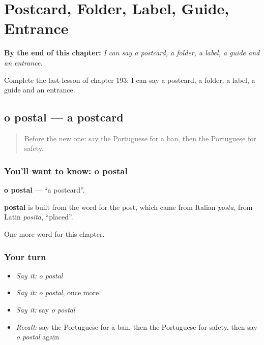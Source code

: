 
\chapter{Postcard, Folder, Label, Guide, Entrance}
\label{ch:pt-postcard-folder-label-guide-entrance}

\begin{chapteropening}
\textbf{By the end of this chapter:} \emph{I can say a postcard, a folder, a label, a guide and an entrance.}

Complete the last lesson of chapter 193: I can say a postcard, a folder, a label, a guide and an entrance.
\end{chapteropening}

\section[o postal]{o postal — a postcard}

\label{lesson:PT-C193-postal}



\begin{quote}
Before the new one: say the Portuguese for a ban, then the Portuguese for safety.
\end{quote}

\subsection*{You'll want to know: o postal}
\textbf{o postal} — \textquotedblleft{}a postcard\textquotedblright{}.

\begin{cousinweb}
\textbf{postal} is built from the word for the post, which came from Italian \emph{posta}, from Latin \emph{posita}, \textquotedblleft{}placed\textquotedblright{}.
\end{cousinweb}

\begin{grammarlens}[title={What you've built}]
One more word for this chapter.
\end{grammarlens}

\subsection*{Your turn}
\begin{itemize}
\raggedright
  \item \emph{Say it:} \emph{o postal}
  \item \emph{Say it:} \emph{o postal}, once more
  \item \emph{Say it:} say \emph{o postal}
  \item \emph{Recall:} say the Portuguese for a ban, then the Portuguese for safety, then say \emph{o postal} again
\end{itemize}

